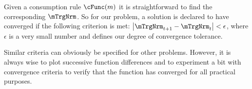 Given a consumption rule $\cFunc(\mNrm)$ it is straightforward to find
the corresponding $\mTrgNrm$.  So for our problem, a solution is declared
to have converged if the following criterion is met:
$\left|\mTrgNrm_{\prdt+1}-\mTrgNrm_{\prdt}\right| < \epsilon$, where $\epsilon$ is
a very small number and defines our degree of convergence tolerance.

Similar criteria can obviously be specified for other problems.
However, it is always wise to plot successive function differences and
to experiment a bit with convergence criteria to verify that the
function has converged for all practical purposes.

